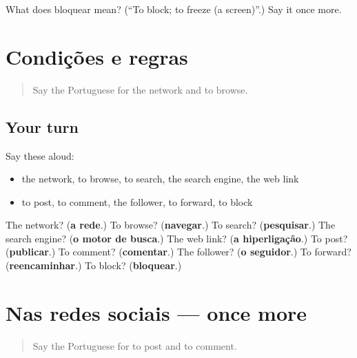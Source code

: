 \begin{tcolorbox}[breakable,colback=teal!4,colframe=teal!35!black,title={Before you move on}]
What does bloquear mean? (\textquotedblleft{}To block; to freeze (a screen)\textquotedblright{}.) Say it once more.
\end{tcolorbox}
\section[(dialogue)]{Condições e regras}

\label{lesson:PT-R400-revisao-399-400}



\begin{quote}
Say the Portuguese for the network and to browse.
\end{quote}

\subsection*{Your turn}
Say these aloud:

\begin{itemize}
\raggedright
  \item the network, to browse, to search, the search engine, the web link
  \item to post, to comment, the follower, to forward, to block
\end{itemize}

\begin{tcolorbox}[breakable,colback=teal!4,colframe=teal!35!black,title={Before you move on}]
The network? (\textbf{a rede}.) To browse? (\textbf{navegar}.) To search? (\textbf{pesquisar}.) The search engine? (\textbf{o motor de busca}.) The web link? (\textbf{a hiperligação}.) To post? (\textbf{publicar}.) To comment? (\textbf{comentar}.) The follower? (\textbf{o seguidor}.) To forward? (\textbf{reencaminhar}.) To block? (\textbf{bloquear}.)
\end{tcolorbox}
\section[(dialogue)]{Nas redes sociais — once more}

\label{lesson:PT-R400-revisao-final-400}



\begin{quote}
Say the Portuguese for to post and to comment.
\end{quote}

